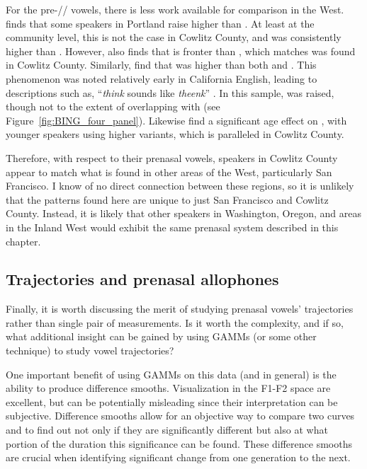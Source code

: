 For the pre-// vowels, there is less work available for comparison in the West. \citet[46]{conn_2000_diss} finds that some speakers in Portland raise \ban higher than \bang. At least at the community level, this is not the case in Cowlitz County, and \bang was consistently higher than \ban. However, \citet{conn_2000_diss} also finds that \bang is fronter than \ban, which matches was found in Cowlitz County. Similarly, \citet[42]{cardoso_etal_2016_pads} find that \bing was higher than both \bit and \bin. This phenomenon was noted relatively early in California English, leading to descriptions such as, ``\textit{think} sounds like \textit{theenk}'' \citep{eckert_2004}. In this sample, \bing was raised, though not to the extent of overlapping with \fleece (see Figure~\ref{fig:BING_four_panel}). Likewise \citet{cardoso_etal_2016_pads} find a significant age effect on \bang, with younger speakers using higher variants, which is paralleled in Cowlitz County.

Therefore, with respect to their prenasal vowels, speakers in Cowlitz County appear to match what is found in other areas of the West, particularly San Francisco. I know of no direct connection between these regions, so it is unlikely that the patterns found here are unique to just San Francisco and Cowlitz County. Instead, it is likely that other speakers in Washington, Oregon, and  areas in the Inland West would exhibit the same prenasal system described in this chapter.


\subsection{Trajectories and prenasal allophones}

Finally, it is worth discussing the merit of studying prenasal vowels' trajectories rather than single pair of measurements. Is it worth the complexity, and if so, what additional insight can be gained by using GAMMs (or some other technique) to study vowel trajectories?

One important benefit of using GAMMs on this data (and in general) is the ability to produce difference smooths. Visualization in the F1-F2 space are excellent, but can be potentially misleading since their interpretation can be subjective. Difference smooths allow for an objective way to compare two curves and to find out not only if they are significantly different but also at what portion of the duration this significance can be found. These difference smooths are crucial when identifying significant change from one generation to the next.

